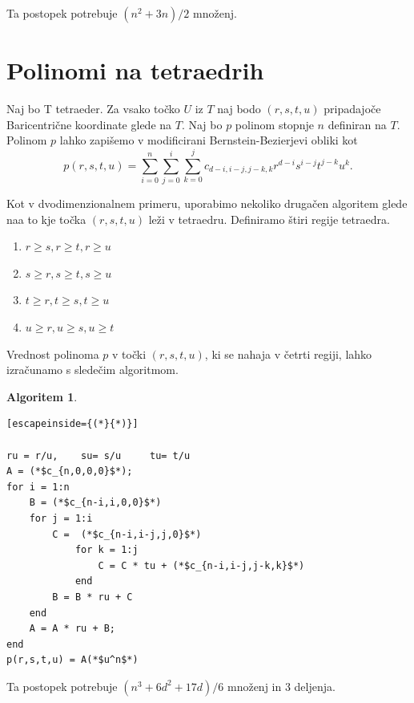 \documentclass{article}
\newtheorem{algoritm}{Algoritem}[section]
\begin{document}
Ta postopek potrebuje $(n^2+3n)/2$ množenj.


\section{Polinomi na tetraedrih}

Naj bo T tetraeder. Za vsako točko $U$ iz $T$ naj bodo $(r,s,t,u)$ pripadajoče Baricentrične koordinate glede na $T$.  Naj bo $p$ polinom stopnje $n$ definiran na $T$. Polinom $p$ lahko zapišemo v modificirani Bernstein-Bezierjevi obliki kot 
$$p(r,s,t,u) = \sum_{i = 0}^n{\sum_{j=0}^{i}{\sum_{k = 0}^{j}{c_{d-i,i-j,j-k,k} r^{d-i} s^{i-j} t^{j-k} u^k}}}.$$

Kot v dvodimenzionalnem primeru, uporabimo nekoliko drugačen algoritem glede naa to kje točka $(r, s, t, u)$ leži v tetraedru.
Definiramo štiri regije tetraedra.

\begin{enumerate}
\item $r\geq s, r\geq t, r\geq u$
\item $s\geq r, s\geq t, s\geq u$
\item $t\geq r, t\geq s, t\geq u$
\item $u\geq r,u\geq s, u\geq t$
\end{enumerate}


Vrednost polinoma $p$ v točki $(r,s,t,u)$, ki se nahaja v četrti regiji, lahko izračunamo s sledečim algoritmom.

\begin{algoritm}
\begin{lstlisting}[escapeinside={(*}{*)}]

ru = r/u,	 su= s/u	 tu= t/u
A = (*$c_{n,0,0,0}$*);
for i = 1:n
    B = (*$c_{n-i,i,0,0}$*)
    for j = 1:i
        C =  (*$c_{n-i,i-j,j,0}$*)
            for k = 1:j
                C = C * tu + (*$c_{n-i,i-j,j-k,k}$*)
            end
        B = B * ru + C
    end
    A = A * ru + B;
end
p(r,s,t,u) = A(*$u^n$*)

\end{lstlisting}
\end{algoritm}

Ta postopek potrebuje $(n^3+ 6d^2 + 17d)/6$ množenj in 3 deljenja.
\end{document}
